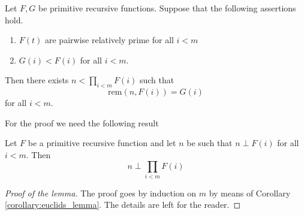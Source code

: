 \documentclass[10pt]{amsart}
\newcommand{\mle}{\boldsymbol{<}}
\newcommand{\meq}{\boldsymbol{=}}
\begin{document}
\begin{theorem}\label{theorem:chinese_remainder_theorem}
	Let $F,G$ be primitive recursive functions. Suppose that the following assertions hold.
	\begin{enumerate}[label=\emph{\textbf{(\arabic*)}}, leftmargin=3.0em]
		\item $F(t)$ are pairwise relatively prime for all $i \mle m$
		\item $G(i) \mle F(i)$ for all $i \mle m$.
	\end{enumerate}
	Then there exists $n \mle \prod_{i \mle m}F(i)$ such that
	$$\mathrm{rem}\left(n,F(i)\right) \meq G(i)$$
	for all $i \mle m$.
\end{theorem}
\noindent
For the proof we need the following result

\begin{lemma}\label{lemma:if_each_factor_is_relatively_prime_then_whole_product_too}
	Let $F$ be a primitive recursive function and let $n$ be such that $n \perp F(i)$ for all $i \mle m$. Then
	$$n \perp \prod_{i \mle m}F(i)$$
\end{lemma}
\begin{proof}[Proof of the lemma]
	The proof goes by induction on $m$ by means of Corollary \ref{corollary:euclids_lemma}. The details are left for the reader.
\end{proof}
\end{document}
